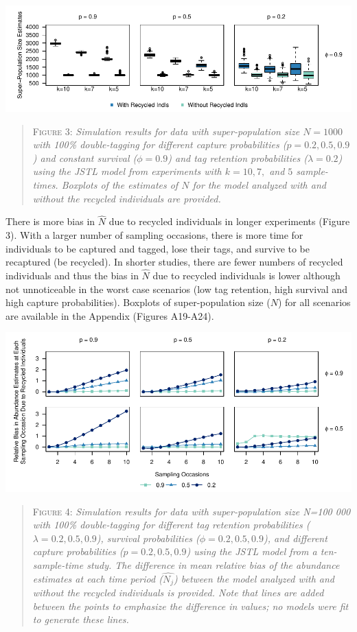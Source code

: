 \documentclass[]{article}
\begin{document}
\includegraphics{RecycledPaper_files/figure-latex/Figure3_N_k-1.pdf}

\begin{quote}
\textsc{Figure 3:}
\textsl{Simulation results for data with super-population size $N=1000$ with 100\% double-tagging for different capture probabilities ($p=0.2,0.5,0.9$) and constant survival ($\phi=0.9$) and tag retention probabilities ($\lambda=0.2$) using the JSTL model from experiments with $k=10, 7,$ and $5$ sample-times. Boxplots of the estimates of $N$ for the model analyzed with and without the recycled individuals are provided.}
\end{quote}

There is more bias in \(\hat{N}\) due to recycled individuals in longer
experiments (Figure 3). With a larger number of sampling occasions,
there is more time for individuals to be captured and tagged, lose their
tags, and survive to be recaptured (be recycled). In shorter studies,
there are fewer numbers of recycled individuals and thus the bias in
\(\hat{N}\) due to recycled individuals is lower although not
unnoticeable in the worst case scenarios (low tag retention, high
survival and high capture probabilities). Boxplots of super-population
size (\(N\)) for all scenarios are available in the Appendix (Figures
A19-A24).

\includegraphics{RecycledPaper_files/figure-latex/Figure4_N_j-1.pdf}

\begin{quote}
\textsc{Figure 4:}
\textsl{Simulation results for data with super-population size N=100 000 with 100\% double-tagging for different tag retention probabilities ($\lambda=0.2,0.5,0.9$), survival probabilities ($\phi=0.2,0.5,0.9$), and different capture probabilities ($p=0.2,0.5,0.9$) using the JSTL model from a ten-sample-time study. The difference in mean relative bias of the abundance estimates at each time period ($\hat{N_j}$) between the model analyzed with and without the recycled individuals is provided. Note that lines are added between the points to emphasize the difference in values; no models were fit to generate these lines.}
\end{quote}
\end{document}
